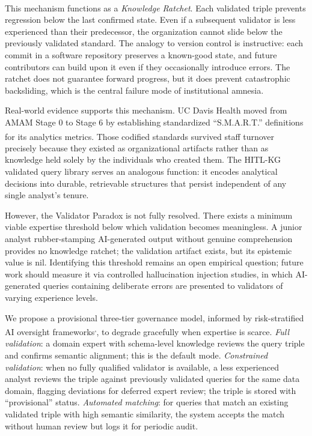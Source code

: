 \documentclass[
  american,
  11pt,
  letterpaper,
  oneside  ,captions=tableheading
]{scrartcl}
\begin{document}
This mechanism functions as a \emph{Knowledge
Ratchet}\textsuperscript{}. Each validated
triple prevents regression below the last confirmed state. Even if a
subsequent validator is less experienced than their predecessor, the
organization cannot slide below the previously validated standard. The
analogy to version control is instructive: each commit in a software
repository preserves a known-good state, and future contributors can
build upon it even if they occasionally introduce errors. The ratchet
does not guarantee forward progress, but it does prevent catastrophic
backsliding, which is the central failure mode of institutional amnesia.

Real-world evidence supports this mechanism. UC Davis Health moved from
AMAM Stage 0 to Stage 6 by establishing standardized ``S.M.A.R.T.''
definitions for its analytics
metrics\textsuperscript{}. Those
codified standards survived staff turnover precisely because they
existed as organizational artifacts rather than as knowledge held solely
by the individuals who created them. The HITL-KG validated query library
serves an analogous function: it encodes analytical decisions into
durable, retrievable structures that persist independent of any single
analyst's tenure.

However, the Validator Paradox is not fully resolved. There exists a
minimum viable expertise threshold below which validation becomes
meaningless. A junior analyst rubber-stamping AI-generated output
without genuine comprehension provides no knowledge ratchet; the
validation artifact exists, but its epistemic value is nil. Identifying
this threshold remains an open empirical question; future work should
measure it via controlled hallucination injection studies, in which
AI-generated queries containing deliberate errors are presented to
validators of varying experience levels.

We propose a provisional three-tier governance model, informed by
risk-stratified AI oversight
frameworks\textsuperscript{,},
to degrade gracefully when expertise is scarce. \emph{Full validation}:
a domain expert with schema-level knowledge reviews the query triple and
confirms semantic alignment; this is the default mode. \emph{Constrained
validation}: when no fully qualified validator is available, a less
experienced analyst reviews the triple against previously validated
queries for the same data domain, flagging deviations for deferred
expert review; the triple is stored with ``provisional'' status.
\emph{Automated matching}: for queries that match an existing validated
triple with high semantic similarity, the system accepts the match
without human review but logs it for periodic audit.
\end{document}

